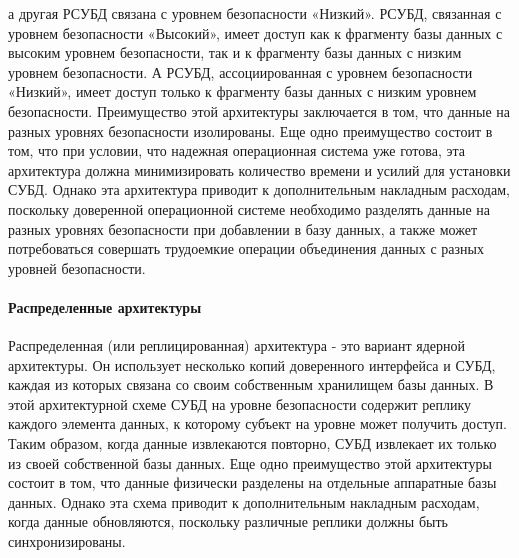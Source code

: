 а другая РСУБД связана с уровнем безопасности «Низкий».
РСУБД, связанная с уровнем безопасности «Высокий», имеет доступ как к фрагменту базы данных с высоким уровнем безопасности,
так и к фрагменту базы данных с низким уровнем безопасности. А РСУБД, ассоциированная с уровнем безопасности «Низкий»,
имеет доступ только к фрагменту базы данных с низким уровнем безопасности.
Преимущество этой архитектуры заключается в том, что данные на разных уровнях безопасности изолированы.
Еще одно преимущество состоит в том, что при условии, что надежная операционная система уже готова,
эта архитектура должна минимизировать количество времени и усилий для установки СУБД.
Однако эта архитектура приводит к дополнительным накладным расходам, поскольку доверенной
операционной системе необходимо разделять данные на разных уровнях безопасности при добавлении в базу данных,
а также может потребоваться совершать трудоемкие операции объединения данных с разных уровней безопасности.

\paragraph{Распределенные архитектуры}
Распределенная (или реплицированная) архитектура - это вариант ядерной архитектуры.
Он использует несколько копий доверенного интерфейса и СУБД, каждая из которых связана
со своим собственным хранилищем базы данных. В этой архитектурной схеме СУБД на уровне
безопасности содержит реплику каждого элемента данных, к которому субъект на уровне может получить доступ.
Таким образом, когда данные извлекаются повторно, СУБД извлекает их только из своей собственной базы данных.
Еще одно преимущество этой архитектуры состоит в том, что данные физически разделены на отдельные аппаратные базы данных.
Однако эта схема приводит к дополнительным накладным расходам, когда данные обновляются, поскольку различные
реплики должны быть синхронизированы.
